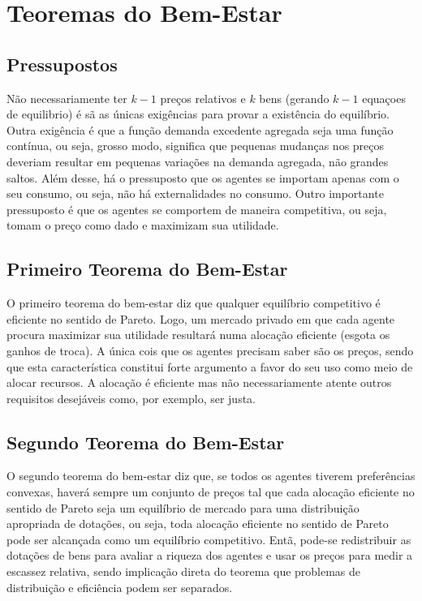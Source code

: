 \documentclass[oneside,12pt, letterpaper]{book}
\begin{document}
\chapter{Teoremas do Bem-Estar}
\section{Pressupostos}
N{\~a}o necessariamente ter $k - 1$ pre{\c c}os relativos e $k$ bens (gerando $k - 1$ equa{\c c}oes de equilibrio) {\'e} s{\~a} as {\'u}nicas exig{\^e}ncias para provar a exist{\^e}ncia do equil{\'i}brio. Outra exig{\^e}ncia {\'e} que a 
fun{\c c}{\~ a}o demanda excedente agregada seja uma fun{\c c}{\~a}o cont{\'i}nua, ou seja, grosso modo, significa que pequenas mudan{\c c}as nos pre{\c c}os deveriam resultar
em pequenas varia{\c c}{\~o}es na demanda agregada, n{\~a}o grandes saltos. Al{\'e}m desse, h{\'a} o pressuposto que os agentes se importam apenas com o seu consumo, ou seja, n{\~a}o
h{\'a} externalidades no consumo. Outro importante pressuposto {\'e} que os agentes se comportem de maneira competitiva, ou seja, tomam o pre{\c c}o como dado e maximizam sua utilidade.

\section{Primeiro Teorema do Bem-Estar}
O primeiro teorema do bem-estar diz que qualquer equil{\'i}brio competitivo {\'e} eficiente no sentido de Pareto.  Logo, um mercado privado em que cada agente procura maximizar sua utilidade
resultar{\'a} numa aloca{\c c}{\~a}o eficiente (esgota os ganhos de troca). A {\'u}nica cois que os agentes precisam saber s{\~a}o os pre{\c c}os, sendo que esta caracter{\'i}stica constitui forte 
argumento a favor do seu uso como meio de alocar recursos. A aloca{\c c}{\~a}o {\'e} eficiente mas n{\~a}o necessariamente atente outros requisitos desej{\'a}veis como, por exemplo, ser justa. 

\section{Segundo Teorema do Bem-Estar}
O segundo teorema do bem-estar diz que, se todos os agentes tiverem prefer{\^e}ncias convexas, haver{\'a} sempre um conjunto de pre{\c c}os tal que cada aloca{\c c}{\~a}o eficiente no sentido
de Pareto seja um equil{\'i}brio de mercado para uma distribui{\c c}{\~a}o apropriada de dota{\c c}{\~o}es, ou seja, toda aloca{\c c}{\~a}o eficiente no sentido de Pareto pode ser alcan{\c c}ada como um 
equil{\'i}brio competitivo. Ent{\~a}, pode-se redistribuir as dota{\c c}{\~o}es de bens para avaliar a riqueza dos agentes e usar os pre{\c c}os para medir a escassez relativa, sendo implica{\c c}{\~a}o direta 
do teorema que problemas de distribui{\c c}{\~a}o e efici{\^e}ncia podem ser separados.  
\end{document}
